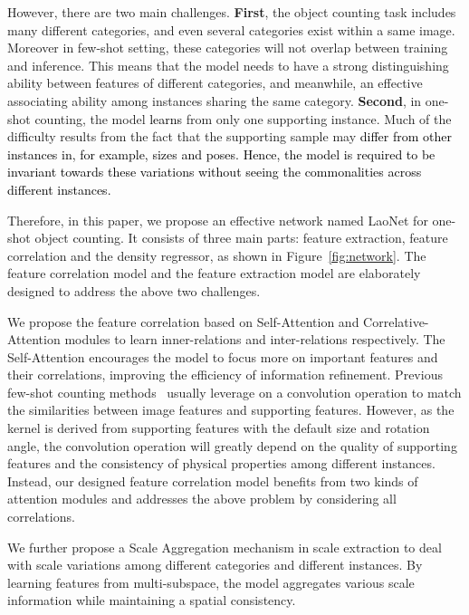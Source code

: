 \documentclass{article}
\newcommand\hui[1]{\textcolor{black}{#1}}%
\newcommand\XP[1]{\textcolor{black}{#1}}%
\begin{document}
However, there are two main challenges. \textbf{First}, the object counting task includes many different categories, and even several categories exist within a same image. Moreover in few-shot setting, these categories will not overlap between training and inference. This means that the model needs to have a strong distinguishing ability between features of different categories, and meanwhile, an effective associating ability among instances sharing the same category.
\textbf{Second}, in one-shot counting, the model \XP{learns}
from only one supporting instance. %
Much of the difficulty results from the fact that the supporting sample may \XP{differ from other instances in, for example, sizes and poses. Hence, the model is required to be invariant towards these variations without seeing the commonalities across different instances.}

Therefore, in this paper, we propose an effective network named LaoNet for one-shot object counting. It consists of three main parts: feature extraction, feature correlation and the density regressor, as shown in Figure~\ref{fig:network}. The feature correlation model and the feature extraction model are elaborately designed to address the above two challenges.

We propose the feature correlation based on Self-Attention and Correlative-Attention modules to learn inner-relations and inter-relations respectively. The Self-Attention encourages the model to focus more on important features and their correlations, improving the efficiency of information refinement. Previous few-shot counting methods~\cite{ranjan2021learning, yang2021class} usually leverage on a convolution operation to match the similarities between image features and supporting features. However, as the kernel is derived from supporting features with the default size and rotation angle, the convolution operation will greatly depend on the quality of supporting features and the consistency of physical properties among different instances. Instead, our designed feature correlation model benefits from two kinds of attention modules and addresses the above problem by considering all correlations.

We further propose a Scale Aggregation mechanism in scale extraction to deal with scale variations among different categories and different instances. By learning features from multi-subspace, the model aggregates various scale information while maintaining a spatial consistency.
\end{document}
